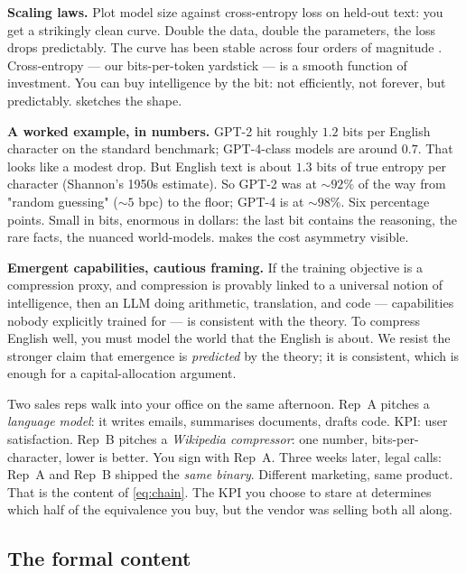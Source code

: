 \begin{intuition}
\textbf{Scaling laws.}  Plot model size against cross-entropy loss
on held-out text: you get a strikingly clean curve.  Double the
data, double the parameters, the loss drops predictably.  The curve
has been stable across four orders of magnitude
\citep{kaplan2020scaling}.  Cross-entropy --- our bits-per-token
yardstick --- is a smooth function of investment.  You can buy
intelligence by the bit: not efficiently, not forever, but
predictably.   sketches the shape.

\textbf{A worked example, in numbers.}  GPT-2 hit roughly $1.2$
bits per English character on the standard benchmark; GPT-4-class
models are around $0.7$.  That looks like a modest drop.  But
English text is about $1.3$ bits of true entropy per character
(Shannon's 1950s estimate).  So GPT-2 was at $\sim 92\%$ of the
way from "random guessing" ($\sim 5$ bpc) to the floor; GPT-4 is
at $\sim 98\%$.  Six percentage points.  Small in bits, enormous
in dollars: the last bit contains the reasoning, the rare facts,
the nuanced world-models.   makes the cost
asymmetry visible.

\textbf{Emergent capabilities, cautious framing.}  If the training
objective is a compression proxy, and compression is provably
linked to a universal notion of intelligence, then an LLM doing
arithmetic, translation, and code --- capabilities nobody
explicitly trained for --- is consistent with the theory.  To
compress English well, you must model the world that the English
is about.  We resist the stronger claim that emergence is
\emph{predicted} by the theory; it is consistent, which is enough
for a capital-allocation argument.
\end{intuition}

\begin{story}
Two sales reps walk into your office on the same afternoon.  Rep~A
pitches a \emph{language model}: it writes emails, summarises
documents, drafts code.  KPI: user satisfaction.  Rep~B pitches a
\emph{Wikipedia compressor}: one number, bits-per-character, lower
is better.  You sign with Rep~A.  Three weeks later, legal calls:
Rep~A and Rep~B shipped the \emph{same binary}.  Different
marketing, same product.  That is the content of \cref{eq:chain}.
The KPI you choose to stare at determines which half of the
equivalence you buy, but the vendor was selling both all along.
\end{story}

\subsection*{The formal content}

